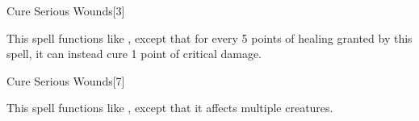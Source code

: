 \begin{spellsection}{Cure Serious Wounds}[3]
    \begin{spellheader}
    \end{spellheader}
    \begin{spellcontent}
        \begin{spelltargetinginfo}
        \end{spelltargetinginfo}
        \begin{spelleffects}
            \spellspecial This spell functions like , except that for every 5 points of healing granted by this spell, it can instead cure 1 point of critical damage.
        \end{spelleffects}
    \end{spellcontent}
    \begin{spellfooter}
        \miscastrandom
    \end{spellfooter}
\end{spellsection}

\begin{spellsection}[Mass]{Cure Serious Wounds}[7]
    \begin{spellheader}
    \end{spellheader}
    \begin{spellcontent}
        \begin{spelltargetinginfo}
        \end{spelltargetinginfo}
        \begin{spelleffects}
            \spellspecial This spell functions like , except that it affects multiple creatures.
        \end{spelleffects}
    \end{spellcontent}
    \begin{spellfooter}
        \miscastexplode
    \end{spellfooter}
\end{spellsection}


